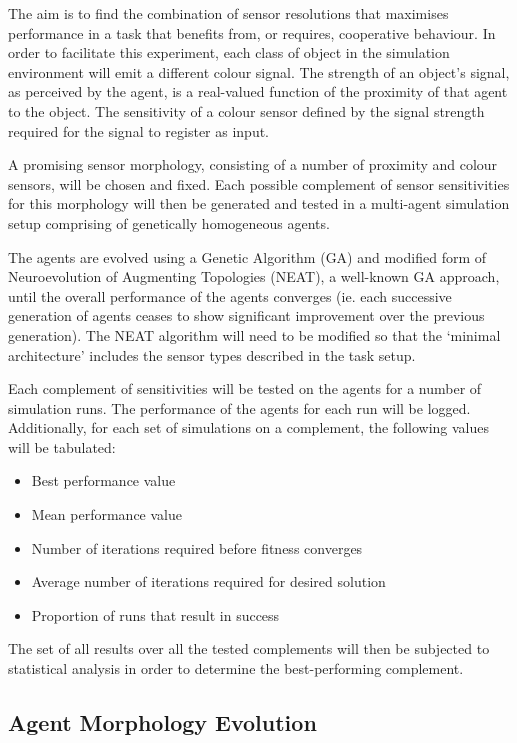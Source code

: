 \documentclass[a4paper,12pt]{article}
\begin{document}
The aim is to find the combination of sensor resolutions that maximises performance in a task that benefits from, or requires, cooperative behaviour. In order to facilitate this experiment, each class of object in the simulation environment will emit a different colour signal. The strength of an object's signal, as perceived by the agent, is a real-valued function of the proximity of that agent to the object. The sensitivity of a colour sensor defined by the signal strength required for the signal to register as input.

A promising sensor morphology, consisting of a number of proximity and colour sensors, will be chosen and fixed. Each possible complement of sensor sensitivities for this morphology will then be generated and tested in a multi-agent simulation setup comprising of genetically homogeneous agents.

The agents are evolved using a Genetic Algorithm (GA) and modified form of Neuroevolution of Augmenting Topologies (NEAT), a well-known GA approach\cite{Stanley02}, until the overall performance of the agents converges (ie. each successive generation of agents ceases to show significant improvement over the previous generation). The NEAT algorithm will need to be modified so that the ‘minimal architecture’ includes the sensor types described in the task setup.

Each complement of sensitivities will be tested on the agents for a number of simulation runs. The performance of the agents for each run will be logged. Additionally, for each set of simulations on a complement, the following values will be tabulated:
\begin{itemize}
\item Best performance value
\item Mean performance value
\item Number of iterations required before fitness converges
\item Average number of iterations required for desired solution
\item Proportion of runs that result in success
\end{itemize}

The set of all results over all the tested complements will then be subjected to statistical analysis in order to determine the best-performing complement.

\subsection{Agent Morphology Evolution}
\end{document}
